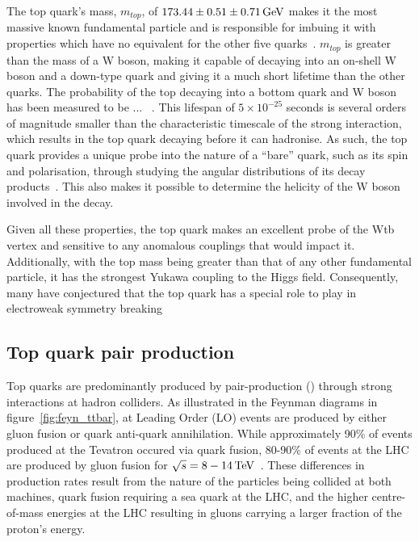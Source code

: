 The top quark's mass, $m_{top}$, of $173.44 \pm 0.51 \pm 0.71 \,\text{Ge\hspace{-.08em}V}$ makes it the most massive known fundamental particle and is responsible for imbuing it with properties which have no equivalent for the other five quarks~\cite{Patrignani:2016xqp}.
$m_{top}$ is greater than the mass of a W boson, making it capable of decaying into an on-shell W boson and a down-type quark and giving it a much short lifetime than the other quarks.
The probability of the top decaying into a bottom quark and W boson has been measured to be ... ~\cite{}.
This lifespan of $5 \times 10^{-25}$ seconds is several orders of magnitude smaller than the characteristic timescale of the strong interaction, which results in the top quark decaying before it can hadronise. 
As such, the top quark provides a unique probe into the nature of a ``bare'' quark, such as its spin and polarisation, through studying the angular distributions of its decay products~\cite{Khachatryan:2015dzz}.
This also makes it possible to determine the helicity of the W boson involved in the decay.

Given all these properties, the top quark makes an excellent probe of the Wtb vertex and sensitive to any anomalous couplings that would impact it.
Additionally, with the top mass being greater than that of any other fundamental particle, it has the strongest Yukawa coupling to the Higgs field.
Consequently, many have conjectured that the top quark has a special role to play in electroweak symmetry breaking~\cite{Giammanco:2017xyn}
 

\subsection{Top quark pair production}\label{subsec:ttbarTheory}
Top quarks are predominantly produced by pair-production (\ttbar) through strong interactions at hadron colliders.
As illustrated in the Feynman diagrams in figure~\ref{fig:feyn_ttbar}, at Leading Order (LO) \ttbar events are produced by either gluon fusion or quark anti-quark annihilation. 
While approximately 90\% of \ttbar events produced at the Tevatron occured via quark fusion, 80-90\% of \ttbar events at the LHC are produced by gluon fusion for $\sqrt{s} = 8-14\,\text{Te\hspace{-.08em}V}$~\cite{Deliot:2011np,Patrignani:2016xqp}.
These differences in production rates result from the nature of the particles being collided at both machines, \ie quark fusion requiring a sea quark at the LHC, and the higher centre-of-mass energies at the LHC resulting in gluons carrying a larger fraction of the proton's energy.

